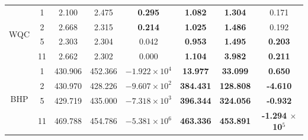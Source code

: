 \begin{table}[tbp]
{\begin{tabular}{|c|c|ccc|ccc|}
\multirow{4}{*}{WQC}               & 1                                & \multicolumn{1}{c|}{2.100}          & \multicolumn{1}{c|}{2.475}   & \textbf{0.295}         & \multicolumn{1}{c|}{\textbf{1.082}}   & \multicolumn{1}{c|}{\textbf{1.304}}   & 0.171                             \\ \cline{2-8} 
                                   & 2                                & \multicolumn{1}{c|}{2.668}          & \multicolumn{1}{c|}{2.315}   & \textbf{0.214}         & \multicolumn{1}{c|}{\textbf{1.025}}   & \multicolumn{1}{c|}{\textbf{1.486}}   & 0.192                             \\ \cline{2-8} 
                                   & 5                                & \multicolumn{1}{c|}{2.303}          & \multicolumn{1}{c|}{2.304}   & 0.042                  & \multicolumn{1}{c|}{\textbf{0.953}}   & \multicolumn{1}{c|}{\textbf{1.495}}   & \textbf{0.203}                    \\ \cline{2-8} 
                                   & 11                               & \multicolumn{1}{c|}{2.662}          & \multicolumn{1}{c|}{2.302}   & 0.000                  & \multicolumn{1}{c|}{\textbf{1.104}}   & \multicolumn{1}{c|}{\textbf{3.982}}   & \textbf{0.211}                    \\ \hline
\multirow{4}{*}{BHP}               & 1                                & \multicolumn{1}{c|}{430.906}        & \multicolumn{1}{c|}{452.366} & $-1.922 \times 10^{4}$ & \multicolumn{1}{c|}{\textbf{13.977}}  & \multicolumn{1}{c|}{\textbf{33.099}}  & \textbf{0.650}                    \\ \cline{2-8} 
                                   & 2                                & \multicolumn{1}{c|}{430.970}        & \multicolumn{1}{c|}{428.226} & $-9.607 \times 10^{2}$ & \multicolumn{1}{c|}{\textbf{384.431}} & \multicolumn{1}{c|}{\textbf{128.808}} & \textbf{-4.610}                   \\ \cline{2-8} 
                                   & 5                                & \multicolumn{1}{c|}{429.719}        & \multicolumn{1}{c|}{435.000} & $-7.318 \times 10^{3}$ & \multicolumn{1}{c|}{\textbf{396.344}} & \multicolumn{1}{c|}{\textbf{324.056}} & \textbf{-0.932}                   \\ \cline{2-8} 
                                   & 11                               & \multicolumn{1}{c|}{469.788}        & \multicolumn{1}{c|}{454.786} & $-5.381 \times 10^{6}$ & \multicolumn{1}{c|}{\textbf{463.336}} & \multicolumn{1}{c|}{\textbf{453.891}} & \textbf{-1.294 $\times$ 10$^{5}$} \\ \hline

\end{tabular}}
\end{table}
